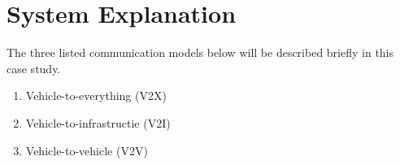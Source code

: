\section{System Explanation}
The three listed communication models below will be described briefly in this case study.

\begin{enumerate}
    \item Vehicle-to-everything (V2X)
    \item Vehicle-to-infrastructie (V2I)
    \item Vehicle-to-vehicle (V2V)
\end{enumerate}




